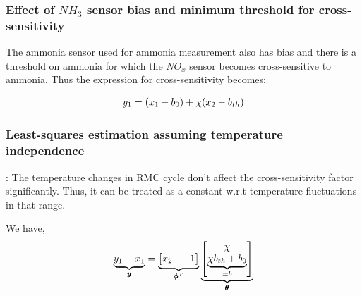 \subsubsection{Effect of $NH_3$ sensor bias and minimum threshold for cross-sensitivity}
The ammonia sensor used for ammonia measurement also has bias and there is a
threshold on ammonia for which the $NO_x$ sensor becomes cross-sensitive to
ammonia. Thus the expression for cross-sensitivity becomes:

\begin{align*}
    y_1 &= \left( x_1 - b_0 \right) + \chi (x_2 - b_{th})\\
\end{align*}

\subsubsection{Least-squares estimation assuming temperature independence}
: The temperature changes in RMC cycle don't affect the
cross-sensitivity factor significantly. Thus, it can be treated as a constant
w.r.t temperature fluctuations in that range.

We have,
\begin{align*}
    \underbrace{y_1 - x_1}_{\pmb y} &= \underbrace{\begin{bmatrix} x_2 & -1 \end{bmatrix}}_{\pmb \phi^T} \underbrace{\begin{bmatrix}  \chi \\ \underbrace{\chi b_{th} + b_0}_{=b} \end{bmatrix}}_{ \pmb \theta}\\
\end{align*}

